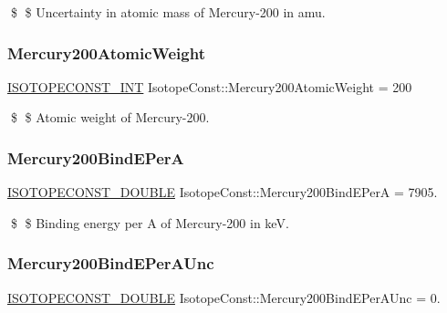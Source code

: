 \$ \$ Uncertainty in atomic mass of Mercury-\/200 in amu. \mbox{\label{group___isotope_const-_mercury-_hg200_ga67eb9a37f9b7812e858a3f2d2a8bfd76}} 
\subsubsection{\texorpdfstring{Mercury200\+Atomic\+Weight}{Mercury200AtomicWeight}}
{\footnotesize\ttfamily \mbox{\hyperlink{group___isotope_const-_macros_ga5f18360b3e99483a35c32d789e62621c}{I\+S\+O\+T\+O\+P\+E\+C\+O\+N\+S\+T\+\_\+\+I\+NT}} Isotope\+Const\+::\+Mercury200\+Atomic\+Weight = 200}

\$ \$ Atomic weight of Mercury-\/200. \mbox{\label{group___isotope_const-_mercury-_hg200_ga5835c3de299c26241c7d3febab684319}} 
\subsubsection{\texorpdfstring{Mercury200\+Bind\+E\+PerA}{Mercury200BindEPerA}}
{\footnotesize\ttfamily \mbox{\hyperlink{group___isotope_const-_macros_ga8f45a7272ce02c0b4c65c44636ed719a}{I\+S\+O\+T\+O\+P\+E\+C\+O\+N\+S\+T\+\_\+\+D\+O\+U\+B\+LE}} Isotope\+Const\+::\+Mercury200\+Bind\+E\+PerA = 7905.}

\$ \$ Binding energy per A of Mercury-\/200 in keV. \mbox{\label{group___isotope_const-_mercury-_hg200_ga91be1c1b34e6ac100f5e923dc8098ff8}} 
\subsubsection{\texorpdfstring{Mercury200\+Bind\+E\+Per\+A\+Unc}{Mercury200BindEPerAUnc}}
{\footnotesize\ttfamily \mbox{\hyperlink{group___isotope_const-_macros_ga8f45a7272ce02c0b4c65c44636ed719a}{I\+S\+O\+T\+O\+P\+E\+C\+O\+N\+S\+T\+\_\+\+D\+O\+U\+B\+LE}} Isotope\+Const\+::\+Mercury200\+Bind\+E\+Per\+A\+Unc = 0.}


